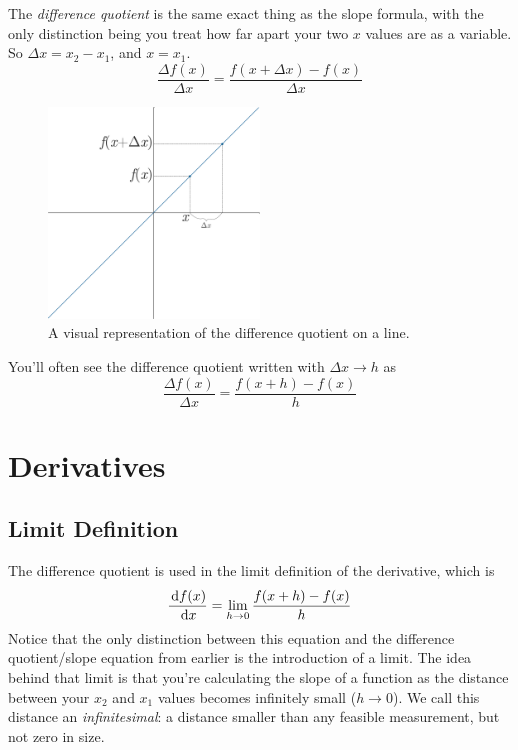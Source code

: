 The \emph{difference quotient} is the same exact thing as the slope formula, with the only distinction
being you treat how far apart your two $x$ values are as a variable. So $\Delta x=x_2-x_1$, and $x=x_1$.
\begin{equation}
  \frac{\Delta f(x)}{\Delta x}=\frac{f(x+\Delta x)-f(x)}{\Delta x}
\end{equation}
\begin{figure}[h]
  \begin{center}
    \includegraphics[width=0.5\textwidth]{continuous/derivatives/diffquot.eps}
  \end{center}
  \caption{A visual representation of the difference quotient on a line.}
\end{figure}
You'll often see the difference quotient written with $\Delta x \to h$ as
\begin{equation}
  \frac{\Delta f(x)}{\Delta x}=\frac{f(x+h)-f(x)}{h}
\end{equation}

\section{Derivatives}

\subsection{Limit Definition}

The difference quotient is used in the limit definition of the derivative, which is
\begin{equation}
  \label{eq:limitdef}
  \frac{\,\mathrm{d} f(x)}{\,\mathrm{d} x}=\lim_{h \to 0} \frac{f(x+h)-f(x)}{h}
\end{equation}
Notice that the only distinction between this equation and the difference quotient/slope equation from earlier is the introduction of a limit. The idea behind that limit is that you're calculating the slope of a function as the distance between your $x_2$ and $x_1$ values becomes infinitely small ($h\to 0$). We call this distance an \emph{infinitesimal}: a distance smaller than any feasible measurement, but not zero in size.

